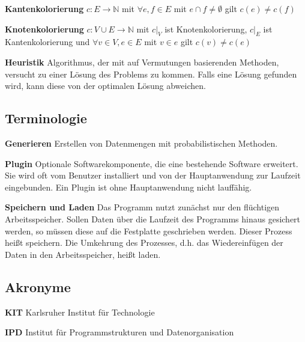 \documentclass{article}
\begin{document}
	\hangindent=1.5cm 
	\textbf{Kantenkolorierung} \newline
	$c: E \to \mathbb N$ mit $\forall e,f \in E$ mit $e \cap f \neq \emptyset$ gilt $c(e) \neq c(f)$
	
	\hangindent=1.5cm 
	\textbf{Knotenkolorierung} \newline
	$c: V \cup E \to \mathbb N$ mit $c \vert _V$ ist Knotenkolorierung, $c \vert_E$ ist Kantenkolorierung und $\forall v \in V, e \in E$ mit $v \in e$ gilt $c(v) \neq c(e)$
	
	\hangindent=1.5cm 
	\textbf{Heuristik} \newline
	Algorithmus, der mit auf Vermutungen basierenden Methoden, versucht zu einer Lösung des Problems zu kommen. Falls eine Lösung gefunden wird, kann diese von der optimalen Lösung abweichen.
	
	\subsection{Terminologie}
	
	\hangindent=1.5cm 
	\textbf{Generieren} \newline
	Erstellen von Datenmengen mit probabilistischen Methoden.
	
	\hangindent=1.5cm 
	\textbf{Plugin} \newline
	Optionale Softwarekomponente, die eine bestehende Software erweitert. Sie wird oft vom Benutzer installiert und von der Hauptanwendung zur Laufzeit eingebunden. Ein Plugin ist ohne Hauptanwendung nicht lauffähig.
	
	\hangindent=1.5cm 
	\textbf{Speichern und Laden} \newline
	Das Programm nutzt zunächst nur den flüchtigen Arbeitsspeicher. Sollen Daten über die Laufzeit des Programms hinaus gesichert werden, so müssen diese auf die Festplatte geschrieben werden. Dieser Prozess heißt speichern. Die Umkehrung des Prozesses, d.h. das Wiedereinfügen der Daten in den Arbeitsspeicher, heißt laden.
	
	\subsection{Akronyme}
	
	\textbf{KIT} Karlsruher Institut für Technologie
	
	\textbf{IPD} Institut für Programmstrukturen und Datenorganisation
	
\end{document}
